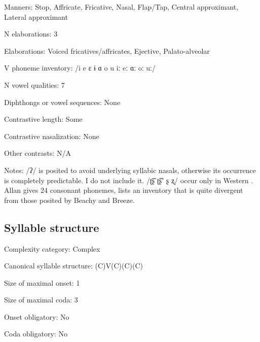 {\begin{appendixdesc}
\item[Manners:] Stop, Affricate, Fricative, Nasal, Flap/Tap, Central approximant, Lateral approximant

\item[N elaborations:] 3

\item[Elaborations:] Voiced fricatives/affricates, Ejective, Palato-alveolar

\item[V phoneme inventory:] /i e ɛ ɨ ɑ o u iː eː ɑː oː uː/

\item[N vowel qualities:] 7

\item[Diphthongs or vowel sequences:] None

\item[Contrastive length:] Some

\item[Contrastive nasalization:] None

\item[Other contrasts:] N/A

\item[Notes:] /ʔ/ is posited to avoid underlying syllabic nasals, otherwise its occurrence is completely predictable. I do not include it. /ʈ͡ʂ ʈ͡ʂ’ ʂ ʐ/ occur only in Western  \citep{Beachy2005}. Allan gives 24 consonant phonemes, lists an inventory that is quite divergent from those posited by Beachy and Breeze.
\end{appendixdesc}
\subsection*{Syllable structure}
\begin{appendixdesc}

\item[Complexity category:] Complex

\item[Canonical syllable structure:] (C)V(C)(C)(C) \citep[38--46]{Beachy2005}

\item[Size of maximal onset:] 1

\item[Size of maximal coda:] 3

\item[Onset obligatory:] No

\item[Coda obligatory:] No


\end{appendixdesc}}
